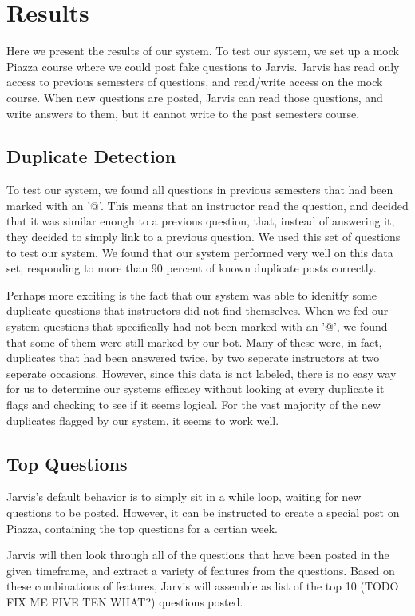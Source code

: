 \documentclass[sigconf]{acmart}
\begin{document}
\section{Results}
Here we present the results of our system.
To test our system, we set up a mock Piazza course where we could post fake questions to Jarvis. Jarvis has read only access to previous semesters of questions, and read/write access on the mock course. When new questions are posted, Jarvis can read those questions, and write answers to them, but it cannot write to the past semesters course.

\subsection{Duplicate Detection}
To test our system, we found all questions in previous semesters that had been marked with an '@'. This means that an instructor read the question, and decided that it was similar enough to a previous question, that, instead of answering it, they decided to simply link to a previous question. We used this set of questions to test our system. We found that our system performed very well on this data set, responding to more than 90 percent of known duplicate posts correctly.

Perhaps more exciting is the fact that our system was able to idenitfy some duplicate questions that instructors did not find themselves. When we fed our system questions that specifically had not been marked with an '@', we found that some of them were still marked by our bot. Many of these were, in fact, duplicates that had been answered twice, by two seperate instructors at two seperate occasions. However, since this data is not labeled, there is no easy way for us to determine our systems efficacy without looking at every duplicate it flags and checking to see if it seems logical. For the vast majority of the new duplicates flagged by our system, it seems to work well.

\subsection{Top Questions}
Jarvis's default behavior is to simply sit in a while loop, waiting for new questions to be posted. However, it can be instructed to create a special post on Piazza, containing the top questions for a certian week.

Jarvis will then look through all of the questions that have been posted in the given timeframe, and extract a variety of features from the questions. Based on these combinations of features, Jarvis will assemble as list of the top 10 (TODO FIX ME FIVE TEN WHAT?) questions posted. 
\end{document}
